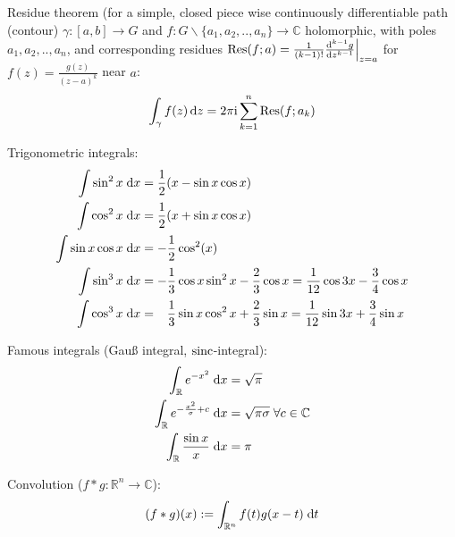 			\noindent
			Residue theorem (for a simple, closed piece wise continuously differentiable path (contour) $\gamma:\left[a,b\right]\rightarrow G$ and $f:G\backslash\lbrace a_1, a_2, .., a_n\rbrace \rightarrow \mathbb{C}$ holomorphic,
			with poles $a_1, a_2, .., a_n$, and corresponding residues $\mathrm{Res}(f; a) = \frac{1}{(k-1)!}\frac{\mathrm{d}^{k-1} g}{\mathrm{d} z^{k-1}}\Big|_{z=a}$ for $f(z)=\frac{g(z)}{(z-a)^k}$ near $a$:
			\begin{equation}
				\int_\gamma f(z)\,\mathrm{d} z = 2\pi \mathrm{i} \sum_{k=1}^{n} \mathrm{Res}(f; a_k)
			\end{equation}

			\noindent
			Trigonometric integrals:
			\begin{equation}
				\begin{split}
					\int \sin^2 x\;\mathrm{d} x &= \frac{1}{2}( x-\sin  x\cos  x) \\
					\int \cos^2 x\;\mathrm{d} x &= \frac{1}{2}( x+\sin  x\cos  x) \\
					\int{\sin x\cos x\;\mathrm{d}x} &= -\frac{1}{2}\cos^2( x) \\
					\int \sin^3 x\;\mathrm{d} x &= -\frac{1}{3}\cos{ x}\sin^2{ x}-\frac{2}{3}\cos{ x}
					= \frac{1}{12}\cos{3 x}-\frac{3}{4}\cos{ x} \\
					\int \cos^3 x\;\mathrm{d} x &= \phantom{-}\frac{1}{3}\sin x \cos^2 x+\frac{2}{3}\sin  x
					= \frac{1}{12}\sin{3 x}+\frac{3}{4}\sin{ x} \\
				\end{split}
			\end{equation}

			\noindent
			Famous integrals (Gauß integral, $\mathrm{sinc}$-integral):
			\begin{equation}
				\begin{aligned}
					\int_\mathbb{R} e^{-x^2}\;\mathrm{d} x &= \sqrt{\pi} \\
					\int_\mathbb{R} e^{-\frac{x^2}{\sigma}+c}\;\mathrm{d} x &= \sqrt{\pi\sigma} \;\forall c\in\mathbb{C} \\
					\int_\mathbb{R} \frac{\sin x}{x}\;\mathrm{d} x &= \pi \\
				\end{aligned}
			\end{equation}

			\noindent
			Convolution ($f*g:\mathbb{R}^n \rightarrow \mathbb{C}$):
			\begin{equation}
				(f*g)(x) := \int_{\mathbb{R}^n} f(t) g(x-t)\;\mathrm{d} t
			\end{equation}

